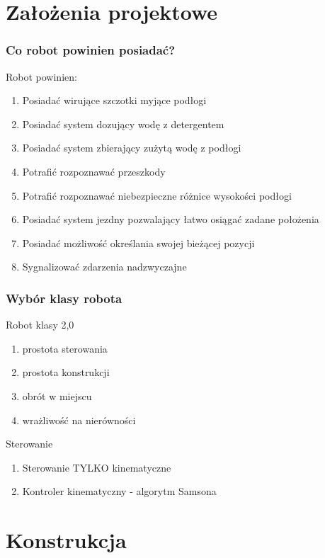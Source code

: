 \section{Założenia projektowe}
\begin{frame}
\frametitle{Co robot powinien posiadać?}
\begin{block}{Robot powinien:}
\begin{enumerate}
\setlength{\itemsep}{2mm}
\item Posiadać wirujące szczotki myjące podłogi
\item Posiadać system dozujący wodę z detergentem
\item Posiadać system zbierający zużytą wodę z podłogi
\item Potrafić rozpoznawać przeszkody
\item Potrafić rozpoznawać niebezpieczne różnice wysokości podłogi
\item Posiadać system jezdny pozwalający łatwo osiągać zadane położenia
\item Posiadać możliwość określania swojej bieżącej pozycji
\item Sygnalizować zdarzenia nadzwyczajne
\end{enumerate}
\end{block}
\end{frame}

\begin{frame}
\frametitle{Wybór klasy robota}
\begin{block}{Robot klasy 2,0}
\begin{enumerate}
\setlength{\itemsep}{2mm}
\item prostota sterowania
\item prostota konstrukcji
\item obrót w miejscu
\item wrażliwość na nierówności
\end{enumerate}
\end{block}
\begin{block}{Sterowanie}
	\begin{enumerate}
		\item Sterowanie TYLKO kinematyczne
		\item Kontroler kinematyczny - algorytm Samsona
	\end{enumerate}
\end{block}
\end{frame}

\section{Konstrukcja}

